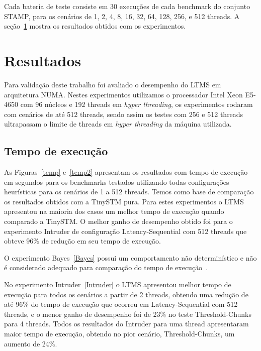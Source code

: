\documentclass[diss,capa]{texufpel}
\begin{document}
Cada bateria de teste consiste em 30 execuções de cada benchmark do conjunto STAMP, para os cenários de 1, 2, 4, 8, 16, 32, 64, 128, 256, e 512 threads. A seção~\ref{resultados} mostra os resultados obtidos com os experimentos.

\section{Resultados}
\label{resultados}

Para validação deste trabalho foi avaliado o desempenho do LTMS em arquitetura NUMA.  Nestes experimentos utilizamos o processador Intel Xeon E5-4650 com 96 núcleos e 192 threads em \emph{hyper threading}, os experimentos rodaram com cenários de até 512 threads, sendo assim os testes com 256 e 512 threads ultrapassam o limite de threads em \emph{hyper threading} da máquina utilizada.

\subsection{Tempo de execução}

As Figuras~\ref{temp} e~\ref{temp2} apresentam os resultados com tempo de execução em segundos para os benchmarks testados utilizando todas configurações heurísticas para os cenários de 1 a 512 threads. Temos como base de comparação os resultados obtidos com a TinySTM pura. Para estes experimentos o LTMS apresentou na maioria dos casos um melhor tempo de execução quando comparado a TinySTM. O melhor ganho de desempenho obtido foi para o experimento Intruder de configuração Latency-Sequential com 512 threads que obteve 96\% de redução em seu tempo de execução.

O experimento Bayes~\ref{Bayes} possui um comportamento não determinístico e não é considerado adequado para comparação do tempo de execução~\cite{Ruan:2014}.


No experimento Intruder~\ref{Intruder} o LTMS apresentou melhor tempo de execução para todos os cenários a partir de 2 threads, obtendo uma redução de até 96\% do tempo de execução que ocorreu em Latency-Sequential com 512 threads, e o menor ganho de desempenho foi de 23\% no teste Threshold-Chunks para 4 threads. Todos os resultados do Intruder para uma thread apresentaram maior tempo de execução, obtendo no pior cenário, Threshold-Chunks, um aumento de 24\%.
\end{document}
